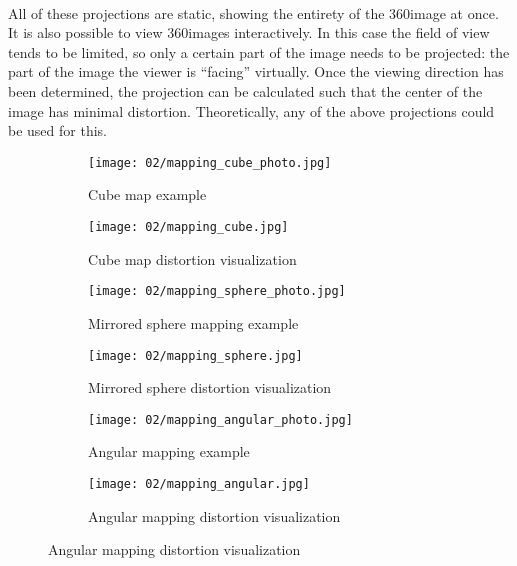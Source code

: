 \paragraph*{}
All of these projections are static, showing the entirety of the 360\degree image at once. It is also possible to view 360\degree images interactively. In this case the field of view tends to be limited, so only a certain part of the image needs to be projected: the part of the image the viewer is ``facing'' virtually. Once the viewing direction has been determined, the projection can be calculated such that the center of the image has minimal distortion. Theoretically, any of the above projections could be used for this. 

\begin{figure}
\centering
    \hfill
    \begin{subfigure}[t]{0.5\textwidth}            
            \centering
            \texttt{[image: 02/mapping\_cube\_photo.jpg]}
            \caption{Cube map example}\label{fig:cubemap-intro}
    \end{subfigure}%
    \hfill
    \begin{subfigure}[t]{0.5\textwidth}
            \centering
            \texttt{[image: 02/mapping\_cube.jpg]}
            \caption{Cube map distortion visualization}\label{fig:cubemap-distortion}
  
    \end{subfigure}
    \hfill
    \par\bigskip %

    \hfill
    \begin{subfigure}[t]{0.5\textwidth}
            \centering
            \texttt{[image: 02/mapping\_sphere\_photo.jpg]}
            \caption{Mirrored sphere mapping example}
            \label{fig:sphere-intro}
    \end{subfigure}%
    \hfill
    \begin{subfigure}[t]{0.5\textwidth}
            \centering
            \texttt{[image: 02/mapping\_sphere.jpg]}
            \caption{Mirrored sphere distortion visualization}
    \end{subfigure}
    \hfill
    \par\bigskip %

    \hfill
    \begin{subfigure}[t]{0.5\textwidth}            
            \centering
            \texttt{[image: 02/mapping\_angular\_photo.jpg]}
            \caption{Angular mapping example}
            \label{fig:angular-intro}
    \end{subfigure}%
    \hfill
    \begin{subfigure}[t]{0.5\textwidth}
            \centering
            \texttt{[image: 02/mapping\_angular.jpg]}
            \caption{Angular mapping distortion visualization}
    \end{subfigure}
    \hfill
    \par\bigskip %


\end{figure}
